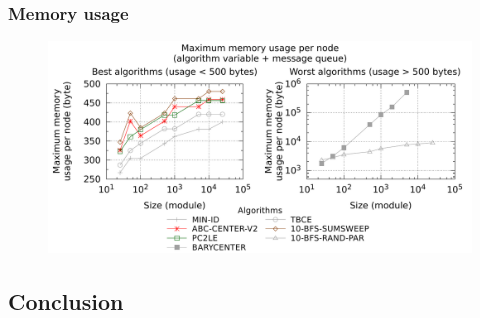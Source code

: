 \begin{frame} \frametitle{Memory usage}

\begin{figure}
	\centering
	\includegraphics[width=0.9\linewidth]{fig/centrality/memory-defense}
\end{figure}


\end{frame}

\subsection{Conclusion}


